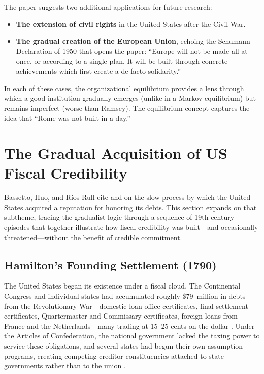 \documentclass[12pt]{article}
\begin{document}
The paper suggests two additional applications for future research:
\begin{itemize}
  \item \textbf{The extension of civil rights} in the United States after the
    Civil War.
  \item \textbf{The gradual creation of the European Union}, echoing the
    Schumann Declaration of 1950 that opens the paper: ``Europe will not be made
    all at once, or according to a single plan.  It will be built through
    concrete achievements which first create a de facto solidarity.''
\end{itemize}

In each of these cases, the organizational equilibrium provides a lens through
which a good institution gradually emerges (unlike in a Markov equilibrium) but
remains imperfect (worse than Ramsey).  The equilibrium concept captures the idea
that ``Rome was not built in a day.''


\section{The Gradual Acquisition of US Fiscal Credibility}

Bassetto, Huo, and R\'ios-Rull cite \citet{sargent2017honoring} and
\citet{hallsargent2014,hallsargent2018} on the slow process by which the
United States acquired a reputation for honoring its debts.  This section
expands on that subtheme, tracing the gradualist logic through a sequence
of 19th-century episodes that together illustrate how fiscal credibility
was built---and occasionally threatened---without the benefit of
credible commitment.

\subsection{Hamilton's Founding Settlement (1790)}

The United States began its existence under a fiscal cloud.  The
Continental Congress and individual states had accumulated roughly
\$79~million in debts from the Revolutionary War---domestic loan-office
certificates, final-settlement certificates, Quartermaster and
Commissary certificates, foreign loans from France and the
Netherlands---many trading at 15--25 cents on the dollar
\citep[pp.~271--275]{Ferguson1961}.  Under the Articles of Confederation,
the national government lacked the taxing power to service these
obligations, and several states had begun their own assumption programs,
creating competing creditor constituencies attached to state governments
rather than to the union \citep[pp.~237--239]{Ferguson1961}.
\end{document}
